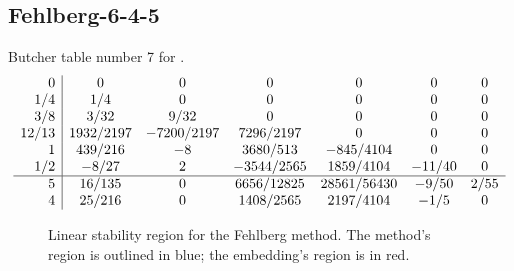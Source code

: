 \documentclass[letterpaper,10pt,english]{sphinxmanual}
\begin{document}
\subsection{Fehlberg-6-4-5}
\label{Butcher:butcher-fehlberg}\label{Butcher:fehlberg-6-4-5}
Butcher table number 7
for {\hyperref[c_interface/User_callable:ARKodeSetERKTableNum]{}}.
\begin{gather}
\begin{split}\begin{array}{r|cccccc}
  0 & 0 & 0 & 0 & 0 & 0 & 0 \\
  1/4 & 1/4 & 0 & 0 & 0 & 0 & 0 \\
  3/8 & 3/32 & 9/32 & 0 & 0 & 0 & 0 \\
  12/13 & 1932/2197 & -7200/2197 & 7296/2197 & 0 & 0 & 0 \\
  1 & 439/216 & -8 & 3680/513 & -845/4104 & 0 & 0 \\
  1/2 & -8/27 & 2 & -3544/2565 & 1859/4104 & -11/40 & 0 \\
  \hline
  5 & 16/135 & 0 & 6656/12825 & 28561/56430 & -9/50 & 2/55 \\
  4 & 25/216 & 0 & 1408/2565 & 2197/4104 & -1/5 & 0
\end{array}\end{split}\notag
\end{gather}\begin{figure}[htbp]
\centering
\capstart

\caption{Linear stability region for the Fehlberg method.  The method's
region is outlined in blue; the embedding's region is in red.}\end{figure}
\end{document}
